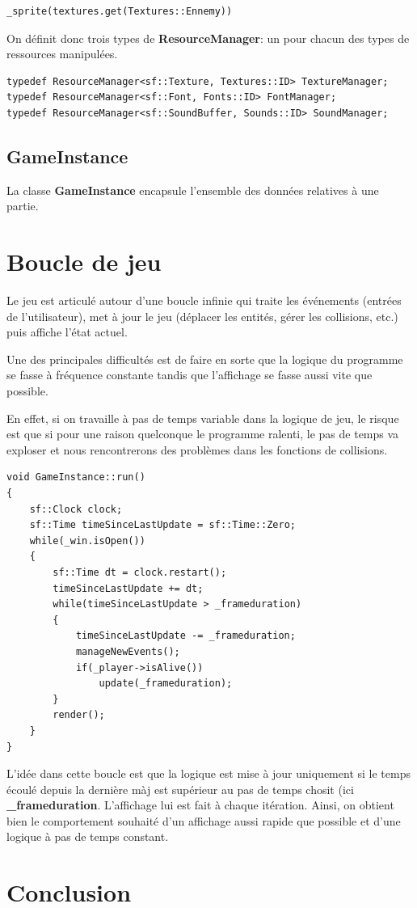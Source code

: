 \documentclass{article}
\begin{document}
\begin{verbatim} 
_sprite(textures.get(Textures::Ennemy))
\end{verbatim}

On définit donc trois types de \textbf{ResourceManager}: un pour chacun des types de ressources manipulées.


\begin{verbatim} 
typedef ResourceManager<sf::Texture, Textures::ID> TextureManager;
typedef ResourceManager<sf::Font, Fonts::ID> FontManager;
typedef ResourceManager<sf::SoundBuffer, Sounds::ID> SoundManager;
\end{verbatim}


\subsection{GameInstance}

La classe \textbf{GameInstance} encapsule l'ensemble des données relatives à une partie.










\section{Boucle de jeu}

Le jeu est articulé autour d'une boucle infinie qui traite les événements (entrées de l'utilisateur), met à jour le jeu (déplacer les entités, gérer les collisions, etc.) puis affiche l'état actuel.

Une des principales difficultés est de faire en sorte que la logique du programme se fasse à fréquence constante tandis que l'affichage se fasse aussi vite que possible.

En effet, si on travaille à pas de temps variable dans la logique de jeu, le risque est que si pour une raison quelconque le programme ralenti, le pas de temps va exploser et nous rencontrerons des problèmes dans les fonctions de collisions.


\begin{verbatim} 
void GameInstance::run()
{
    sf::Clock clock;
    sf::Time timeSinceLastUpdate = sf::Time::Zero;
    while(_win.isOpen())
    {
        sf::Time dt = clock.restart();
        timeSinceLastUpdate += dt;
        while(timeSinceLastUpdate > _frameduration)
        {
            timeSinceLastUpdate -= _frameduration;
            manageNewEvents();
            if(_player->isAlive())
                update(_frameduration);
        }
        render();
    }
}
\end{verbatim}

L'idée dans cette boucle est que la logique est mise à jour uniquement si le temps écoulé depuis la dernière màj est supérieur au pas de temps chosit (ici \textbf{\_frameduration}. L'affichage lui est fait à chaque itération. Ainsi, on obtient bien le comportement souhaité d'un affichage aussi rapide que possible et d'une logique à pas de temps constant.


\section{Conclusion}
\end{document}
